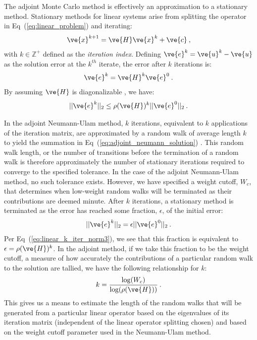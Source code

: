 \documentclass[preprint,11pt]{elsarticle}
\begin{document}
The adjoint Monte Carlo method is effectively an approximation to a
stationary method. Stationary methods for linear systems arise from
splitting the operator in Eq~(\ref{eq:linear_problem}) and iterating:
\begin{equation}
  \ve{x}^{k+1} = \ve{H}\ve{x}^k + \ve{c}\:,
  \label{eq:linear_iterative_method}
\end{equation}
with $k \in \mathbb{Z}^+$ defined as the \textit{iteration
  index}. Defining $\ve{e}^k = \ve{u}^k - \ve{u}$ as the solution
error at the $k^{th}$ iterate, the error after $k$ iterations is:
\begin{equation}
  \ve{e}^{k} = \ve{H}^k\ve{e}^0\:. 
  \label{eq:linear_k_iter_error}
\end{equation}
By assuming $\ve{H}$ is diagonalizable \cite{leveque_finite_2007}, we have:
\begin{equation}
  ||\ve{e}^{k}||_2 \leq \rho(\ve{H})^k ||\ve{e}^0||_2\:.
  \label{eq:linear_k_iter_norm3}
\end{equation}

In the adjoint Neumann-Ulam method, $k$ iterations, equivalent to $k$
applications of the iteration matrix, are approximated by a random walk of
average length $k$ to yield the summation in
Eq~(\ref{eq:adjoint_neumann_solution})
\cite{dimov_new_1998,danilov_asymptotic_2000}. This random walk length, or the
number of transitions before the termination of a random walk is therefore
approximately the number of stationary iterations required to converge to the
specified tolerance. In the case of the adjoint Neumann-Ulam method, no such
tolerance exists. However, we have specified a weight cutoff, $W_c$, that
determines when low-weight random walks will be terminated as their
contributions are deemed minute. After $k$ iterations, a stationary method is
terminated as the error has reached some fraction, $\epsilon$, of the initial
error:
\begin{equation}
  ||\ve{e}^{k}||_2 = \epsilon ||\ve{e}^0||_2\:.
  \label{eq:linear_k_iter_norm4}
\end{equation}
Per Eq~(\ref{eq:linear_k_iter_norm3}), we see that this fraction is equivalent
to $\epsilon = \rho(\ve{H})^k$. In the adjoint method, if we take this
fraction to be the weight cutoff, a measure of how accurately the
contributions of a particular random walk to the solution are tallied, we have
the following relationship for $k$:
\begin{equation}
  k = \frac{ \log(W_c) }{ \log( \rho(\ve{H}) ) }\:.
  \label{eq:analytic_k}
\end{equation}
This gives us a means to estimate the length of the random walks that will be
generated from a particular linear operator based on the eigenvalues of its
iteration matrix (independent of the linear operator splitting chosen) and
based on the weight cutoff parameter used in the Neumann-Ulam method.
\end{document}
